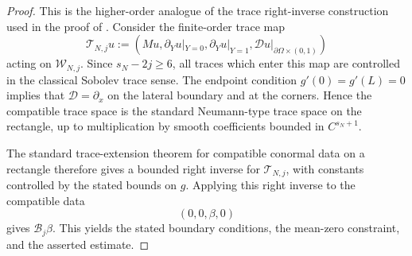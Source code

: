 \documentclass[11pt]{article}
\theoremstyle{definition}
\theoremstyle{remark}
\numberwithin{equation}{section}
\begin{document}
\begin{proof}
This is the higher-order analogue of the trace right-inverse construction used
in the proof of . Consider the
finite-order trace map
\[
\mathcal T_{N,j}u
:=
\left(
Mu,
\partial_Yu|_{Y=0},
\partial_Yu|_{Y=1},
\mathcal Du|_{\partial\Omega\times(0,1)}
\right)
\]
acting on \(\mathcal W_{N,j}\). Since \(s_N-2j\ge6\), all traces which enter
this map are controlled in the classical Sobolev trace sense. The endpoint
condition \(g'(0)=g'(L)=0\) implies that \(\mathcal D=\partial_x\) on the
lateral boundary and at the corners. Hence the compatible trace space is the
standard Neumann-type trace space on the rectangle, up to multiplication by
smooth coefficients bounded in \(C^{s_N+1}\).

The standard trace-extension theorem for compatible conormal data on a rectangle
therefore gives a bounded right inverse for \(\mathcal T_{N,j}\), with constants
controlled by the stated bounds on \(g\). Applying this right inverse to the
compatible data
\[
(0,0,\beta,0)
\]
gives \(\mathscr B_j\beta\). This yields the stated boundary conditions, the
mean-zero constraint, and the asserted estimate.
\end{proof}






\end{document}
